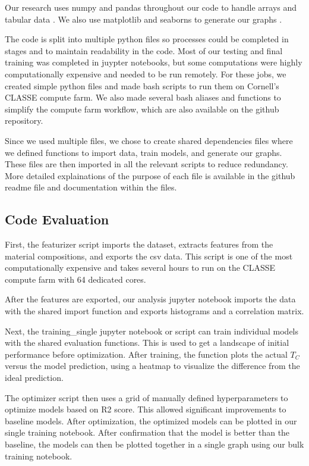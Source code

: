 \documentclass[twocolumn, nofootinbib, secnumarabic, amssymb, nobibnotes, aps, prd]{revtex4-2}
\begin{document}
Our research uses numpy and pandas throughout our code to handle arrays and tabular data \cite{Harris2020array, Reback2020pandas}. We also use matplotlib and seaborns to generate our graphs \cite{Hunter2007, Waskom2021}.

The code is split into multiple python files so processes could be completed in stages and to maintain readability in the code. Most of our testing and final training was completed in juypter notebooks, but some computations were highly computationally expensive and needed to be run remotely. For these jobs, we created simple python files and made bash scripts to run them on Cornell's CLASSE compute farm. We also made several bash aliases and functions to simplify the compute farm workflow, which are also available on the github repository. 

Since we used multiple files, we chose to create shared dependencies files where we defined functions to import data, train models, and generate our graphs. These files are then imported in all the relevant scripts to reduce redundancy. More detailed explainations of the purpose of each file is available in the github readme file and documentation within the files.

\subsection{Code Evaluation}

First, the featurizer script imports the dataset, extracts features from the material compositions, and exports the csv data. This script is one of the most computationally expensive and takes several hours to run on the CLASSE compute farm with 64 dedicated cores.

After the features are exported, our analysis jupyter notebook imports the data with the shared import function and exports histograms and a correlation matrix. 

Next, the training\_single jupyter notebook or script can train individual models with the shared evaluation functions. This is used to get a landscape of initial performance before optimization. After training, the function plots the actual $T_C$ versus the model prediction, using a heatmap to visualize the difference from the ideal prediction.

The optimizer script then uses a grid of manually defined hyperparameters to optimize models based on R2 score. This allowed significant improvements to baseline models. After optimization, the optimized models can be plotted in our single training notebook. After confirmation that the model is better than the baseline, the models can then be plotted together in a single graph using our bulk training notebook. 
\end{document}
